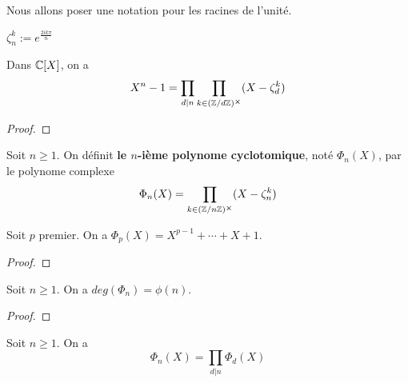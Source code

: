 Nous allons poser une notation pour les racines de l'unité.

\begin{notation}
	$\zeta_{n}^{k} := e^{\frac{2 i k \pi}{n}}$
\end{notation}

\begin{proposition}
	Dans $\mathbb{C}[X]$, on a
	\begin{equation}
		X^{n} - 1 = \displaystyle \prod_{d|n} \prod_{k \in (\mathbb{Z}/ d \mathbb{Z})^{\cross}} (X
		- \zeta_{d}^{k})
	\end{equation}
\end{proposition}

\ifdefined\outputproof
\begin{proof}

\end{proof}
\fi

\begin{definition} 
	Soit $n \geq 1$. On définit \textbf{le $n$-ième polynome cyclotomique}, noté
	$\Phi_{n}(X)$, par le polynome complexe
	\begin{equation}
		\Phi_{n}(X) = \prod_{k \in (\mathbb{Z}/ n \mathbb{Z})^{\cross}} (X - \zeta_{n}^{k})
	\end{equation}
\end{definition}

\begin{proposition}
	Soit $p$ premier.
	On a $\Phi_{p}(X) = X^{p - 1} + \cdots + X + 1$.
\end{proposition}

\ifdefined\outputproof
\begin{proof}

\end{proof}
\fi

\begin{proposition}
	Soit $n \geq 1$. On a $deg(\Phi_{n}) = \phi(n)$.
\end{proposition}

\ifdefined\outputproof
\begin{proof}

\end{proof}
\fi

\begin{proposition}
	Soit $n \geq 1$. On a
	\begin{equation}
		\Phi_{n}(X) = \prod_{d | n} \Phi_{d}(X)
	\end{equation}
\end{proposition}

